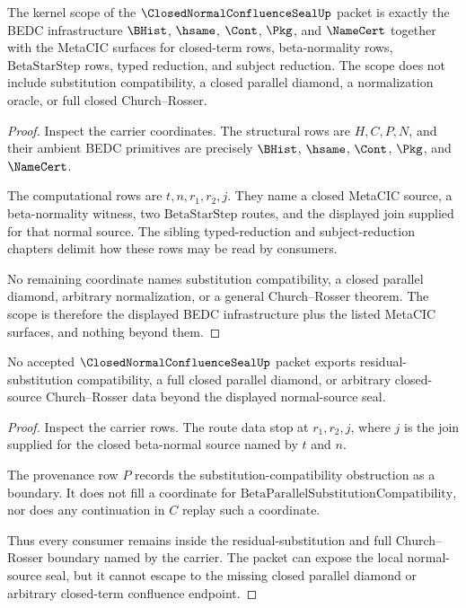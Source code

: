 \begin{theorem}
\label{thm:closed-normal-confluence-seal-kernel-scope}
The kernel scope of the $\ClosedNormalConfluenceSealUp$ packet is exactly the
BEDC infrastructure $\BHist$, $\hsame$, $\Cont$, $\Pkg$, and $\NameCert$ together
with the MetaCIC surfaces for closed-term rows, beta-normality rows,
$\mathrm{BetaStarStep}$ rows, typed reduction, and subject reduction. The scope
does not include substitution compatibility, a closed parallel diamond, a
normalization oracle, or full closed Church--Rosser.
\end{theorem}
\begin{proof}
Inspect the carrier coordinates. The structural rows are $H,C,P,N$, and their
ambient BEDC primitives are precisely $\BHist$, $\hsame$, $\Cont$, $\Pkg$, and
$\NameCert$.

The computational rows are $t,n,r_1,r_2,j$. They name a closed MetaCIC source, a
beta-normality witness, two $\mathrm{BetaStarStep}$ routes, and the displayed
join supplied for that normal source. The sibling typed-reduction and
subject-reduction chapters delimit how these rows may be read by consumers.

No remaining coordinate names substitution compatibility, a closed parallel
diamond, arbitrary normalization, or a general Church--Rosser theorem. The
scope is therefore the displayed BEDC infrastructure plus the listed MetaCIC
surfaces, and nothing beyond them.
\end{proof}

\begin{theorem}
\label{thm:closed-normal-confluence-seal-boundary-nonescape}
No accepted $\ClosedNormalConfluenceSealUp$ packet exports residual-substitution
compatibility, a full closed parallel diamond, or arbitrary closed-source
Church--Rosser data beyond the displayed normal-source seal.
\end{theorem}
\begin{proof}
Inspect the carrier rows. The route data stop at $r_1,r_2,j$, where $j$ is the
join supplied for the closed beta-normal source named by $t$ and $n$.

The provenance row $P$ records the substitution-compatibility obstruction as a
boundary. It does not fill a coordinate for
$\mathrm{BetaParallelSubstitutionCompatibility}$, nor does any continuation in
$C$ replay such a coordinate.

Thus every consumer remains inside the residual-substitution and full
Church--Rosser boundary named by the carrier. The packet can expose the local
normal-source seal, but it cannot escape to the missing closed parallel diamond
or arbitrary closed-term confluence endpoint.
\end{proof}

